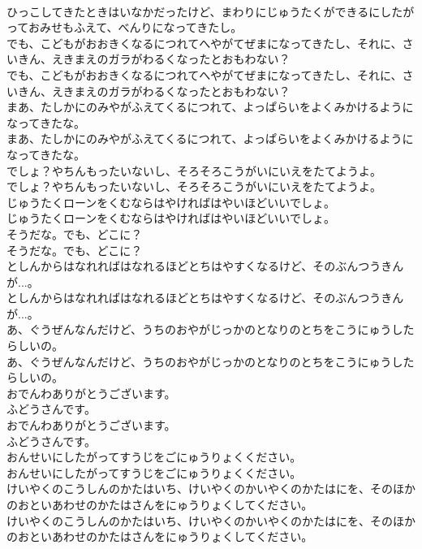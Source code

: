 \documentclass[8pt]{extreport}
\begin{document}
\begin{CJK}{UTF8}{min}
\\	ひっこしてきたときはいなかだったけど、まわりにじゅうたくができるにしたがっておみせもふえて、べんりになってきたし。 
\\	でも、こどもがおおきくなるにつれてへやがてぜまになってきたし、それに、さいきん、えきまえのガラがわるくなったとおもわない？	
\\	でも、こどもがおおきくなるにつれてへやがてぜまになってきたし、それに、さいきん、えきまえのガラがわるくなったとおもわない？ 
\\	まあ、たしかにのみやがふえてくるにつれて、よっぱらいをよくみかけるようになってきたな。	
\\	まあ、たしかにのみやがふえてくるにつれて、よっぱらいをよくみかけるようになってきたな。 
\\	でしょ？やちんもったいないし、そろそろこうがいにいえをたてようよ。	
\\	でしょ？やちんもったいないし、そろそろこうがいにいえをたてようよ。 
\\	じゅうたくローンをくむならはやければはやいほどいいでしょ。	
\\	じゅうたくローンをくむならはやければはやいほどいいでしょ。 
\\	そうだな。でも、どこに？	
\\	そうだな。でも、どこに？ 
\\	としんからはなれればはなれるほどとちはやすくなるけど、そのぶんつうきんが...。	
\\	としんからはなれればはなれるほどとちはやすくなるけど、そのぶんつうきんが...。 
\\	あ、ぐうぜんなんだけど、うちのおやがじっかのとなりのとちをこうにゅうしたらしいの。	
\\	あ、ぐうぜんなんだけど、うちのおやがじっかのとなりのとちをこうにゅうしたらしいの。 
\\	おでんわありがとうございます。
\\	ふどうさんです。	
\\	おでんわありがとうございます。
\\	ふどうさんです。 
\\	おんせいにしたがってすうじをごにゅうりょくください。	
\\	おんせいにしたがってすうじをごにゅうりょくください。 
\\	けいやくのこうしんのかたはいち、けいやくのかいやくのかたはにを、そのほかのおといあわせのかたはさんをにゅうりょくしてください。	
\\	けいやくのこうしんのかたはいち、けいやくのかいやくのかたはにを、そのほかのおといあわせのかたはさんをにゅうりょくしてください。 

\end{CJK}
\end{document}
